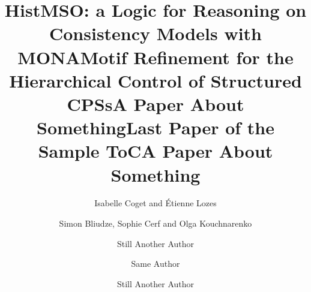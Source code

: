 \documentclass[runningheads]{llncs}
\begin{document}
\setcounter{page}{22}
\author{Isabelle Coget and Étienne Lozes}
\title{HistMSO: a Logic for Reasoning on Consistency Models with MONA}
\maketitle
\clearpage

\setcounter{page}{44}
\author{Simon Bliudze, Sophie Cerf and Olga Kouchnarenko}
\title{Motif Refinement for the Hierarchical Control of Structured CPSs}
\maketitle
\clearpage

\setcounter{page}{31}
\author{Still Another Author}
\title{A Paper About Something}
\maketitle
\clearpage

\setcounter{page}{41}
\author{Same Author}
\title{Last Paper of the Sample ToC}
\maketitle
\clearpage

\setcounter{page}{51}
\phantom{Author Index}
\clearpage

\setcounter{page}{31}
\author{Still Another Author}
\title{A Paper About Something}
\maketitle
\clearpage
\end{document}

